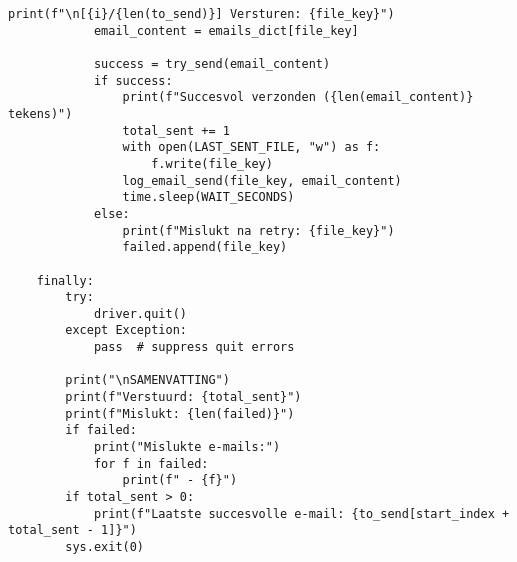 \begin{lstlisting}[style=custompython,caption={Selenium WebDriver script voor automatisering van gegevensverwerking},label={lst:send-request}]
            print(f"\n[{i}/{len(to_send)}] Versturen: {file_key}")
            email_content = emails_dict[file_key]

            success = try_send(email_content)
            if success:
                print(f"Succesvol verzonden ({len(email_content)} tekens)")
                total_sent += 1
                with open(LAST_SENT_FILE, "w") as f:
                    f.write(file_key)
                log_email_send(file_key, email_content)
                time.sleep(WAIT_SECONDS)
            else:
                print(f"Mislukt na retry: {file_key}")
                failed.append(file_key)

    finally:
        try:
            driver.quit()
        except Exception:
            pass  # suppress quit errors

        print("\nSAMENVATTING")
        print(f"Verstuurd: {total_sent}")
        print(f"Mislukt: {len(failed)}")
        if failed:
            print("Mislukte e-mails:")
            for f in failed:
                print(f" - {f}")
        if total_sent > 0:
            print(f"Laatste succesvolle e-mail: {to_send[start_index + total_sent - 1]}")
        sys.exit(0)
\end{lstlisting}